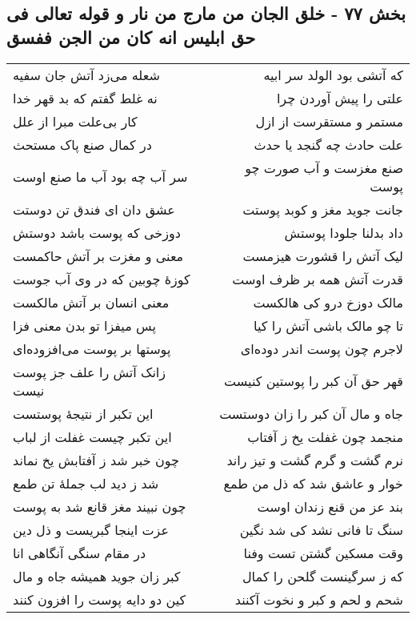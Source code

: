 \begin{center}
\section*{بخش ۷۷ - خلق الجان من مارج من نار و قوله تعالی فی حق ابلیس انه  کان من الجن ففسق}
\label{sec:sh077}
\begin{longtable}{l p{0.5cm} r}
شعله می‌زد آتش جان سفیه
&&
که آتشی بود الولد سر ابیه
\\
نه غلط گفتم که بد قهر خدا
&&
علتی را پیش آوردن چرا
\\
کار بی‌علت مبرا از علل
&&
مستمر و مستقرست از ازل
\\
در کمال صنع پاک مستحث
&&
علت حادث چه گنجد یا حدث
\\
سر آب چه بود آب ما صنع اوست
&&
صنع مغزست و آب صورت چو پوست
\\
عشق دان ای فندق تن دوستت
&&
جانت جوید مغز و کوبد پوستت
\\
دوزخی که پوست باشد دوستش
&&
داد بدلنا جلودا پوستش
\\
معنی و مغزت بر آتش حاکمست
&&
لیک آتش را قشورت هیزمست
\\
کوزهٔ چوبین که در وی آب جوست
&&
قدرت آتش همه بر ظرف اوست
\\
معنی انسان بر آتش مالکست
&&
مالک دوزخ درو کی هالکست
\\
پس میفزا تو بدن معنی فزا
&&
تا چو مالک باشی آتش را کیا
\\
پوستها بر پوست می‌افزوده‌ای
&&
لاجرم چون پوست اندر دوده‌ای
\\
زانک آتش را علف جز پوست نیست
&&
قهر حق آن کبر را پوستین کنیست
\\
این تکبر از نتیجهٔ پوستست
&&
جاه و مال آن کبر را زان دوستست
\\
این تکبر چیست غفلت از لباب
&&
منجمد چون غفلت یخ ز آفتاب
\\
چون خبر شد ز آفتابش یخ نماند
&&
نرم گشت و گرم گشت و تیز راند
\\
شد ز دید لب جملهٔ تن طمع
&&
خوار و عاشق شد که ذل من طمع
\\
چون نبیند مغز قانع شد به پوست
&&
بند عز من قنع زندان اوست
\\
عزت اینجا گبریست و ذل دین
&&
سنگ تا فانی نشد کی شد نگین
\\
در مقام سنگی آنگاهی انا
&&
وقت مسکین گشتن تست وفنا
\\
کبر زان جوید همیشه جاه و مال
&&
که ز سرگینست گلحن را کمال
\\
کین دو دایه پوست را افزون کنند
&&
شحم و لحم و کبر و نخوت آکنند
\\

\end{longtable}
\end{center}
